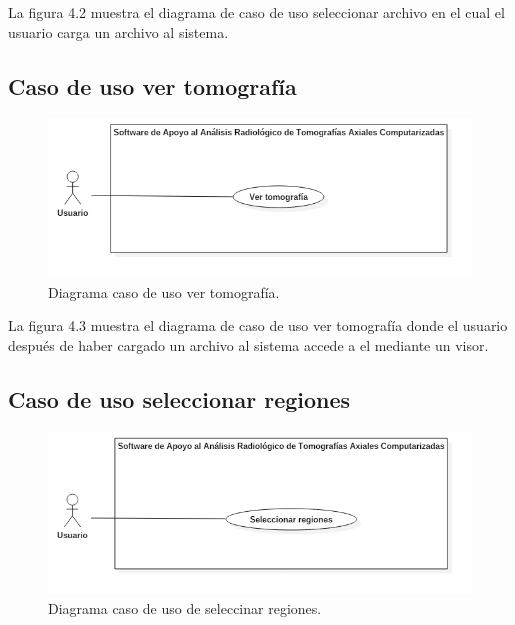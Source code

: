 \documentclass[12pt]{report}
\begin{document}
La figura 4.2 muestra el diagrama de caso de uso seleccionar archivo en el cual el usuario carga un archivo al sistema.

\subsection{Caso de uso ver tomografía}
\begin{figure}[H]
\centering
\includegraphics[width = 9 cm, height =  7 cm]{VerCasos}
\caption{Diagrama caso de uso ver tomografía.}
\end{figure}

La figura 4.3 muestra el diagrama de caso de uso ver tomografía donde el usuario después de haber cargado un archivo al sistema accede a el mediante un visor.

\subsection{Caso de uso seleccionar regiones}
\begin{figure}[H]
\centering
\includegraphics[width = 9 cm, height =  7 cm]{RegionCasos}
\caption{Diagrama caso de uso de seleccinar regiones.}
\end{figure}
\end{document}
